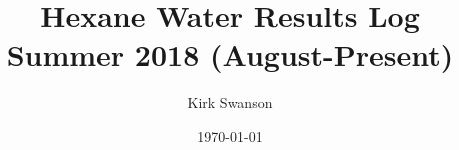 \documentclass[12pt,reqno]{amsart}
\numberwithin{equation}{section}
\begin{document}
\title{Hexane Water Results Log Summer 2018 (August-Present)}
\author{Kirk Swanson}
\address{Institute for Molecular Engineering, University of Chicago, 5640 S Ellis Ave, Chicago, IL 60637}
\date{\today}




\maketitle


\normalsize

\end{document}
